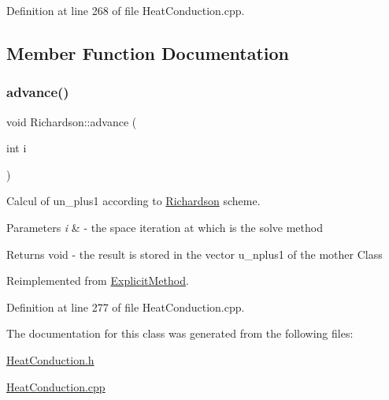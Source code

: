 Definition at line 268 of file Heat\+Conduction.\+cpp.



\subsection{Member Function Documentation}
\mbox{\label{class_richardson_a9be0699e321b038d9361c209b3d542cb}} 
\subsubsection{\texorpdfstring{advance()}{advance()}}
{\footnotesize\ttfamily void Richardson\+::advance (\begin{DoxyParamCaption}\item[{int}]{i }\end{DoxyParamCaption})\hspace{0.3cm}{\ttfamily [virtual]}}



Calcul of un\+\_\+plus1 according to \hyperlink{class_richardson}{Richardson} scheme. 


\begin{DoxyParams}{Parameters}
{\em i} & -\/ the space iteration at which is the solve method \\
\hline
\end{DoxyParams}
\begin{DoxyReturn}{Returns}
void -\/ the result is stored in the vector u\+\_\+nplus1 of the mother Class 
\end{DoxyReturn}


Reimplemented from \hyperlink{class_explicit_method_afdff9dbaacf767cdfe295103f3de41ef}{Explicit\+Method}.



Definition at line 277 of file Heat\+Conduction.\+cpp.



The documentation for this class was generated from the following files\+:\begin{DoxyCompactItemize}
\item 
\hyperlink{_heat_conduction_8h}{Heat\+Conduction.\+h}\item 
\hyperlink{_heat_conduction_8cpp}{Heat\+Conduction.\+cpp}\end{DoxyCompactItemize}
